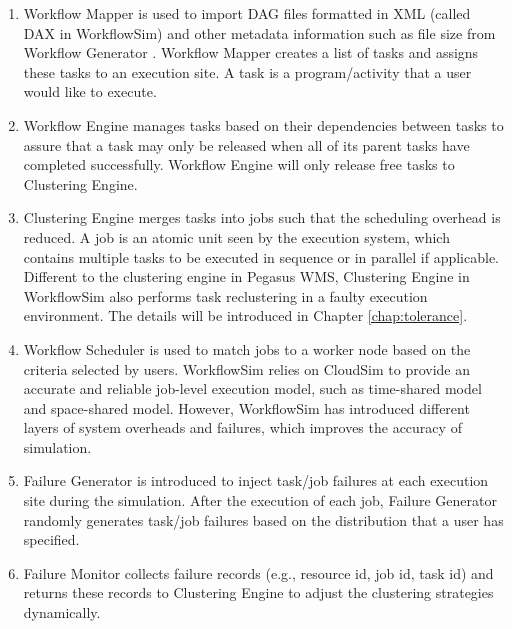 \begin{enumerate}

\item {Workflow Mapper} is used to import DAG files formatted in XML (called DAX in WorkflowSim) and other metadata information such as file size from Workflow Generator \cite{WorkflowGenerator}. Workflow Mapper creates a list of tasks and assigns these tasks to an execution site. A task is a program/activity that a user would like to execute. 

\item{Workflow Engine} manages tasks based on their dependencies between tasks to assure that a task may only be released when all of its parent tasks have completed successfully. Workflow Engine will only release free tasks to Clustering Engine. 

\item{Clustering Engine} merges tasks into jobs such that the scheduling overhead is reduced. A job is an atomic unit seen by the execution system, which contains multiple tasks to be executed in sequence or in parallel if applicable. Different to the clustering engine in Pegasus WMS, Clustering Engine in WorkflowSim also performs task reclustering in a faulty execution environment. The details will be introduced in Chapter \ref{chap:tolerance}. 

\item{Workflow Scheduler} is used to match jobs to a worker node based on the criteria selected by users. WorkflowSim relies on CloudSim to provide an accurate and reliable job-level execution model, such as time-shared model and space-shared model. However, WorkflowSim has introduced different layers of system overheads and failures, which improves the accuracy of simulation. 

\item{Failure Generator} is introduced to inject task/job failures at each execution site during the simulation. After the execution of each job, Failure Generator randomly generates task/job failures based on the distribution that a user has specified. 

\item{Failure Monitor} collects failure records (e.g., resource id, job id, task id) and returns these records to Clustering Engine to adjust the clustering strategies dynamically. 

\end{enumerate}




